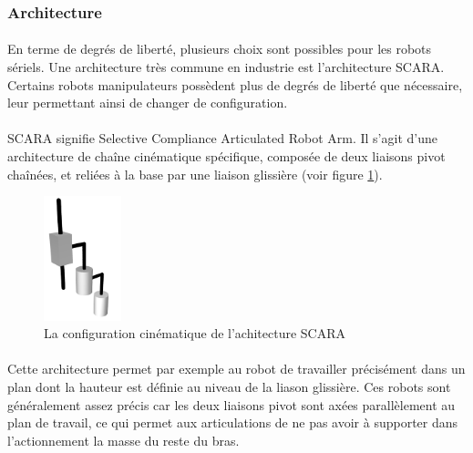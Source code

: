 \documentclass[a4paper,10pt]{article}
\begin{document}
            \subsubsection{Architecture} 
                \paragraph{}
                    En terme de degrés de liberté, plusieurs choix sont possibles 
                    pour les robots sériels. 
                    Une architecture très commune en industrie est l'architecture
                    SCARA. Certains robots manipulateurs possèdent plus de degrés de
                    liberté que nécessaire, leur permettant ainsi de changer de configuration. 
                    
                \paragraph{}
                    SCARA signifie Selective Compliance Articulated Robot Arm. Il s'agit 
                    d'une architecture de chaîne cinématique spécifique, composée
                    de deux liaisons pivot chaînées, et reliées à la base par une 
                    liaison glissière (voir figure \ref{fig:scara}). 
                    
                    
                \begin{figure}[h!]
                    \centering
                    \includegraphics[width=0.2\textwidth]{600px-SCARA_configuration.png}
                    \caption{La configuration cinématique de l'achitecture SCARA}
                    \label{fig:scara}
                \end{figure}
                
                \paragraph{}
                    Cette architecture permet par exemple au robot de travailler précisément
                    dans un plan dont la hauteur est définie au niveau de la liason glissière. 
                    Ces robots sont généralement assez précis car les deux liaisons pivot 
                    sont axées parallèlement au plan de travail, ce qui permet aux articulations
                    de ne pas avoir à supporter dans l'actionnement la masse du reste du bras. 
                    
\end{document}
